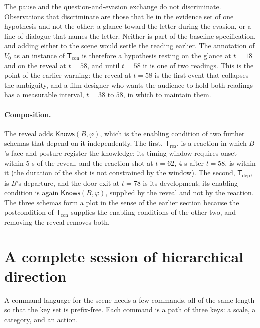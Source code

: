 The pause and the question-and-evasion exchange do not discriminate. Observations that discriminate are those that lie in the evidence set of one hypothesis and not the other: a glance toward the letter during the evasion, or a line of dialogue that names the letter. Neither is part of the baseline specification, and adding either to the scene would settle the reading earlier. The annotation of $V_0$ as an instance of $\mathsf{T}_{\mathrm{con}}$ is therefore a hypothesis resting on the glance at $t=18$ and on the reveal at $t=58$, and until $t=58$ it is one of two readings. This is the point of the earlier warning: the reveal at $t=58$ is the first event that collapses the ambiguity, and a film designer who wants the audience to hold both readings has a measurable interval, $t=38$ to $58$, in which to maintain them.

\paragraph{Composition.} The reveal adds $\mathsf{Knows}(B,\varphi)$, which is the enabling condition of two further schemas that depend on it independently. The first, $\mathsf{T}_{\mathrm{rea}}$, is a reaction in which $B$'s face and posture register the knowledge; its timing window requires onset within $5$ s of the reveal, and the reaction shot at $t=62$, $4$ s after $t=58$, is within it (the duration of the shot is not constrained by the window). The second, $\mathsf{T}_{\mathrm{dep}}$, is $B$'s departure, and the door exit at $t=78$ is its development; its enabling condition is again $\mathsf{Knows}(B,\varphi)$, supplied by the reveal and not by the reaction. The three schemas form a plot in the sense of the earlier section because the postcondition of $\mathsf{T}_{\mathrm{con}}$ supplies the enabling conditions of the other two, and removing the reveal removes both.

\section{A complete session of hierarchical direction}\label{sec:session}

A command language for the scene needs a few commands, all of the same length so that the key set is prefix-free. Each command is a path of three keys: a scale, a category, and an action.

